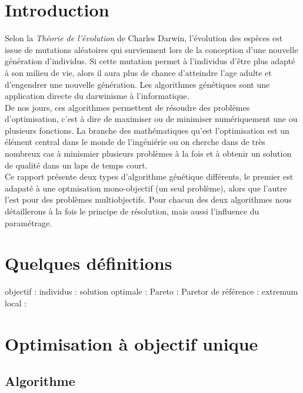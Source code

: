 \documentclass[12pt]{report}
\begin{document}
  \chapter{Introduction}
    Selon la \emph{Théorie de l'évolution} \cite{darwin} de Charles Darwin, l'évolution des espèces est issue de mutations aléatoires qui surviennent lors de la conception d'une nouvelle génération d'individus. Si cette mutation permet à l'individus d'être plus adapté à son milieu de vie, alors il aura plus de chance d'atteindre l'age adulte et d'engendrer une nouvelle génération.
    Les algorithmes génétiques sont une application directe du darwinisme à l'informatique.\\
    De nos jours, ces algorithmes permettent de résoudre des problèmes d'optimisation, c'est à dire de maximiser ou de minimiser numériquement une ou plusieurs fonctions.
    La branche des mathématiques qu'est l'optimisation est un élément central dans le monde de l'ingéniérie ou on cherche dans de très nombreux cas à minismier plusieurs problèmes à la fois et à obtenir un solution de qualité dans un laps de temps court.\\
    Ce rapport présente deux types d'algorithme génétique différents, le premier est adapaté à une optmisation mono-objectif (un seul problème), alors que l'autre l'est pour des problèmes multiobjectifs. Pour chacun des deux algorithmes nous détaillerons à la fois le principe de résolution, mais aussi l'influence du paramétrage.

  \tableofcontents
  \chapter{Quelques définitions}
    objectif :
    individus :
    solution optimale :
    Pareto :
    Paretor de référence :
    extremum local :



  \chapter{Optimisation à objectif unique}
    \section{Algorithme}
\end{document}
